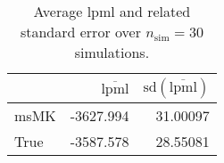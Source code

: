 \begin{table}[H]

\caption{Average lpml and related standard error over $n_{\text{sim}} = 30$ simulations.}
\centering
\begin{tabular}[t]{lrr}
\toprule
  & $\overbar{\text{lpml}}$ & $\text{sd}(\overbar{\text{lpml}})$\\
\midrule
msMK & -3627.994 & 31.00097\\
True & -3587.578 & 28.55081\\
\bottomrule
\end{tabular}
\end{table}